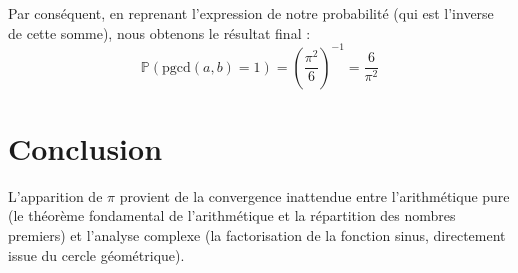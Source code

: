 \documentclass{article}
\begin{document}
Par conséquent, en reprenant l'expression de notre probabilité (qui est l'inverse de cette somme), nous obtenons le résultat final :
\[
\mathbb{P}(\text{pgcd}(a,b)=1) = \left( \frac{\pi^2}{6} \right)^{-1} = \frac{6}{\pi^2}
\]

\section*{Conclusion}
L'apparition de $\pi$ provient de la convergence inattendue entre l'arithmétique pure (le théorème fondamental de l'arithmétique et la répartition des nombres premiers) et l'analyse complexe (la factorisation de la fonction sinus, directement issue du cercle géométrique).
\end{document}
